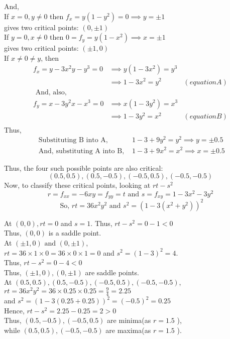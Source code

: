 \documentclass[20pt,a4paper]{extarticle} %
\theoremstyle{definition}
\theoremstyle{definition}
\begin{document}
And,\\
If $x=0,y\neq0$ then $f_x=y(1-y^2)=0 \implies y= \pm 1$\\
gives two critical points: $(0,\pm 1)$\\

If $y=0,x\neq0$ then $0=f_y=y(1-x^2) \implies x= \pm 1$ \\
gives two critical points: $(\pm 1,0)$\\

If $x\neq 0 \neq y$, then \\
\begin{align*}
	f_x=y-3x^2y-y^3=0 & \implies y(1-3x^2)=y^3 &\\
			  & \implies 1-3x^2=y^2 &(equation A)\\
	\text{ And, also, } & &\\
	f_y=x-3y^2x-x^3=0 & \implies x(1-3y^2)=x^3 &\\
			  & \implies 1-3y^2=x^2 &(equation B)\\
\end{align*}
Thus,
\begin{align*}
	\text{ Substituting B into A, } & 1-3+9y^2=y^2 \implies y = \pm 0.5 \\
	\text{ And, substituting A into B, } & 1-3+9x^2=x^2 \implies x = \pm 0.5
\end{align*}

Thus, the four such possible points are also critical:
\[(0.5,0.5),(0.5,-0.5),(-0.5,0.5),(-0.5,-0.5)\]
Now, to classify these critical points, looking at $rt-s^2$
\[ r=f_{xx}=-6xy=f_{yy}=t \text{ and } s=f_{xy}=1-3x^2-3y^2 \]
\[ \text{ So, } rt=36x^2y^2 \text{ and } s^2= (1-3(x^2+y^2))^2 \]

At $(0,0), rt=0$ and $s=1$. Thus, $rt-s^2=0-1<0 $\\
Thus, $(0,0)$ is a saddle point.\\

At $(\pm 1,0) \text{ and } (0, \pm 1)$,\\
$rt=36\times 1 \times 0=36 \times 0 \times 1=0$ and $s^2=(1-3)^2=4$.\\
Thus, $rt-s^2=0-4<0$\\
Thus, $(\pm 1,0) , (0, \pm 1)$ are saddle points.\\

At $(0.5,0.5),(0.5,-0.5),(-0.5,0.5),(-0.5,-0.5)$,\\
$rt=36x^2y^2=36 \times 0.25 \times 0.25=\frac{9}{4}=2.25$ \\ and $s^2=(1-3(0.25+0.25))^2=(-0.5)^2=0.25$\\
Hence, $rt-s^2=2.25-0.25=2>0$ \\
Thus, $(0.5,-0.5),(-0.5,0.5)$ are minima(as $r=1.5$ ),\\ while $(0.5,0.5),(-0.5,-0.5)$ are maxima(as $r=1.5$ ).
\pagebreak
\end{document}
